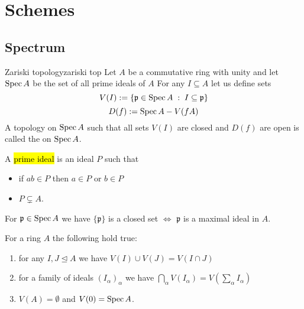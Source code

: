 \chapter{Schemes}

\section{Spectrum}

\begin{definition}{Zariski topology}{zariski top}
  Let $A$ be a commutative ring with unity and let $\operatorname{Spec} A$ be the set of all prime ideals of $A$ For any $I\subseteq A$ let us define sets
  $$V(I):=\{\mathfrak{p}\in\operatorname{Spec} A\;:\;I\subseteq \mathfrak{p}\}$$
  $$D(f):=\operatorname{Spec} A - V(fA)$$
  A topology on $\operatorname{Spec} A$ such that all sets $V(I)$ are closed and $D(f)$ are open is called the  on $\operatorname{Spec} A$.
\end{definition}

A \hl{prime ideal} is an ideal $P$ such that 
\begin{itemize}
  \item if $ab\in P$ then $a\in P$ or $b\in P$
  \item $P\subsetneq A$.
\end{itemize}
For $\mathfrak{p}\in\operatorname{Spec} A$ we have $\{\mathfrak{p}\}$ is a closed set $\iff$ $\mathfrak{p}$ is a maximal ideal in $A$.

\begin{proposition}{}{}
  For a ring $A$ the following hold true:
  \begin{enumerate}[label=\alph*)]
    \item for any $I,J\trianglelefteq A$ we have $V(I)\cup V(J)=V(I\cap J)$
    \item for a family of ideals $(I_\alpha)_\alpha$ we have $\bigcap_\alpha V(I_\alpha)=V(\sum_\alpha I_\alpha)$
    \item $V(A)=\emptyset$ and $V(0)=\operatorname{Spec} A$.
  \end{enumerate}
\end{proposition}


